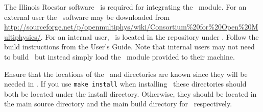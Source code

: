 
The Illinois Rocstar software \IMPACT\, is required for integrating the \icofoam\, module. For an external user the \IMPACT\, software may be downloaded from \url{http://sourceforge.net/p/openmultiphys/wiki/Consortium\%20for\%20Open\%20Multiphysics/}. For an internal user, \impact\, is located in the repository under . Follow the build instructions from the User's Guide. Note that internal users may not need to build \impact\, but instead simply load the \impact\, module provided to their machine. 

Ensure that the locations of the \impact\,  and  directories are known since they will be needed in . If you use \texttt{make install} when installing \impact\, these directories should both be located under the install directory. Otherwise, they should be located in the main source directory and the main build directory for \impact\, respectively.